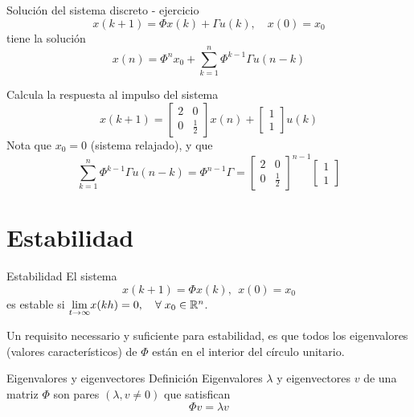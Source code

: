 \documentclass[presentation,aspectratio=1610]{beamer}
\begin{document}
\begin{frame}[label={sec:org73e3d60}]{Solución del sistema discreto - ejercicio}
\begin{equation*}
x(k+1)=\Phi x(k) + \Gamma u(k), \quad x(0)= x_0
\end{equation*}
tiene la solución
\[x(n) = \Phi^n x_0 + \sum_{k=1}^n \Phi^{k-1} \Gamma u(n-k)\]

Calcula la respuesta al impulso del sistema 
\[ x(k+1) = \begin{bmatrix} 2 & 0\\0 & \frac{1}{2} \end{bmatrix} x(n) + \begin{bmatrix} 1\\1\end{bmatrix} u(k) \]
Nota que \(x_0 = 0\) (sistema relajado), y que 
\[ \sum_{k=1}^n \Phi^{k-1} \Gamma u(n-k) = \Phi^{n-1}\Gamma = \begin{bmatrix}2 & 0\\0 & \frac{1}{2} \end{bmatrix}^{n-1} \begin{bmatrix}1\\1\end{bmatrix}\]
\end{frame}




\section{Estabilidad}
\label{sec:orgc1fdaf6}
\begin{frame}[label={sec:org85d792d}]{Estabilidad}
El sistema
\begin{equation*}
x(k+1)=\Phi x(k), \ \ x(0)=x_0
\end{equation*}
es \alert{estable} si  \(\underset{t\to\infty}{\lim}x(kh)=0, \quad \forall\;  x_0\in\Bbb{R}^n\).

Un requisito necessario y suficiente para estabilidad, es que \alert{todos los eigenvalores (valores característicos) de \(\Phi\) están en el interior del círculo unitario.}
\end{frame}

\begin{frame}[label={sec:org4f693fc}]{Eigenvalores y eigenvectores}
\alert{Definición} Eigenvalores \(\lambda\) y eigenvectores \(v\) de una matriz \(\Phi\) son pares \((\lambda, v \neq 0)\) que satisfican
\[ \Phi v = \lambda v \]
\end{frame}
\end{document}
